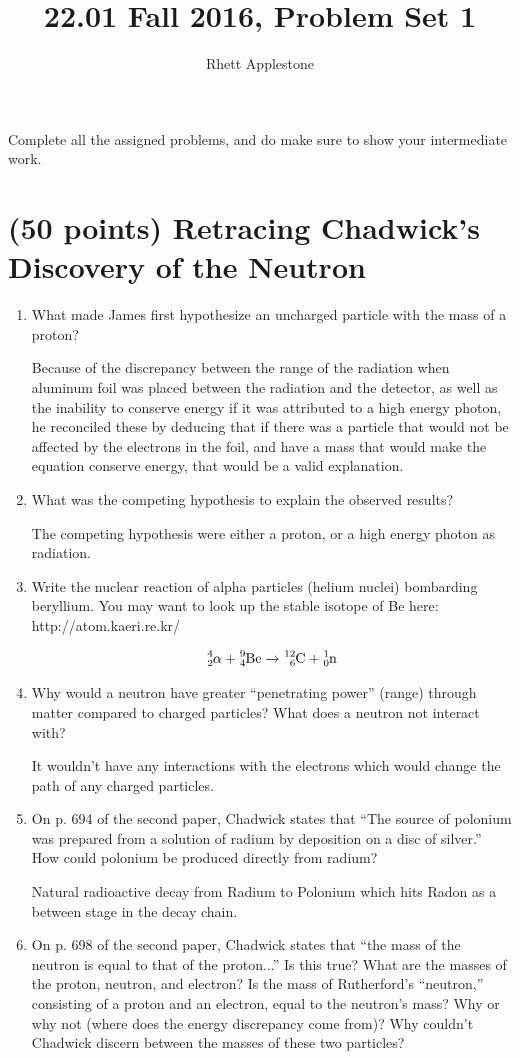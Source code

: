 \documentclass{article}
\title{22.01 Fall 2016, Problem Set 1}
\author{Rhett Applestone}
\date{}
\begin{document}
\maketitle


Complete all the assigned problems, and do make sure to show your intermediate work.

\hrulefill

\section{(50 points) Retracing Chadwick’s Discovery of the Neutron}
\begin{enumerate}
    \item What made James first hypothesize an uncharged particle with the mass of a proton?

    Because of the discrepancy between the range of the radiation when aluminum foil was placed between the radiation and the detector, as well as the inability to conserve energy if it was attributed to a high energy photon, he reconciled these by deducing that if there was a particle that would not be affected by the electrons in the foil, and have a mass that would make the equation conserve energy, that would be a valid explanation.
    \item What was the competing hypothesis to explain the observed results?

    The competing hypothesis were either a proton, or a high energy photon as radiation.
    \item Write the nuclear reaction of alpha particles (helium nuclei) bombarding beryllium. You may want
to look up the stable isotope of Be here: http://atom.kaeri.re.kr/

    $$\ce{^4_2\alpha} + \ce{^9_4Be}\xrightarrow{} \ce{^12_6C} + \ce{^1_0n}$$
    \item Why would a neutron have greater “penetrating power” (range) through matter compared to charged
particles? What does a neutron not interact with?

    It wouldn't have any interactions with the electrons which would change the path of any charged particles.
    \item On p. 694 of the second paper, Chadwick states that “The source of polonium was prepared from a
solution of radium by deposition on a disc of silver.” How could polonium be produced directly from
radium?

    Natural radioactive decay from Radium to Polonium which hits Radon as a between stage in the decay chain.
    \item On p. 698 of the second paper, Chadwick states that “the mass of the neutron is equal to that of the
proton...” Is this true? What are the masses of the proton, neutron, and electron? Is the mass of
Rutherford’s “neutron,” consisting of a proton and an electron, equal to the neutron’s mass? Why or
why not (where does the energy discrepancy come from)? Why couldn’t Chadwick discern between
the masses of these two particles?


\end{enumerate}
\end{document}
